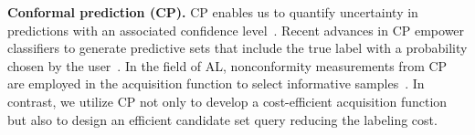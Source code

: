 \textbf{Conformal prediction (CP).}
CP enables us to quantify uncertainty in predictions with an associated confidence level~\citep{shafer2008tutorial}. 
Recent advances in CP empower classifiers to generate predictive sets that include the true label with a probability chosen by the user~\citep{angelopoulos2020uncertainty, angelopoulos-gentle}.
In the field of AL, nonconformity measurements from CP are employed in the acquisition function to select informative samples~\citep{matiz2020conformal}.
In contrast, we utilize CP not only to develop a cost-efficient acquisition function but also to design an efficient candidate set query reducing the labeling cost.

